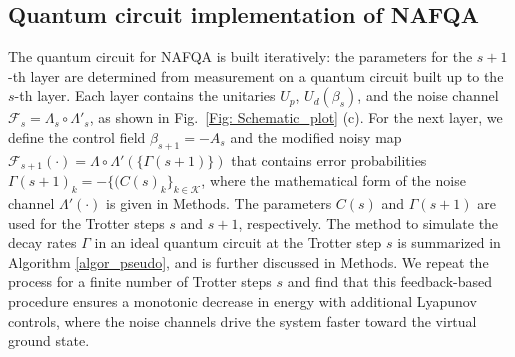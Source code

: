 \documentclass[10pt, superscriptaddress,aps,pra,twocolumn,showpacs,nofootinbib, longbibliography, notitlepage,floatfix]{revtex4-2}
\begin{document}
\subsection*{Quantum circuit implementation of NAFQA}
The quantum circuit for NAFQA is built iteratively: the parameters for the $s+1$-th layer are determined from measurement on a quantum circuit built up to the $s$-th layer. Each layer contains the unitaries $U_p$, $U_d(\beta_s)$, and the noise channel $\mathcal{F}_s = \Lambda_s \circ \Lambda'_s$, as shown in Fig.~\ref{Fig: Schematic_plot} (c). For the next layer, we define the control field $\beta_{s+1} = - A_{s}$ and the modified noisy map $\mathcal{F}_{s+1} (\cdot) = \Lambda \circ \Lambda' (\{\Gamma(s+1)\})$ that contains error probabilities $\Gamma(s+1)_k = - \{(C(s)_k\}_{k\in \mathcal{K}}$, where the mathematical form of the noise channel $\Lambda'(\cdot)$ is given in Methods. The parameters $C(s)$ and $\Gamma(s+1)$ are used for the Trotter steps $s$ and $s+1$, respectively. The method to simulate the decay rates $\Gamma$ in an ideal quantum circuit at the Trotter step $s$ is summarized in Algorithm \ref{algor_pseudo}, and is further discussed in Methods. We repeat the process for a finite number of Trotter steps $s$ and find that this feedback-based procedure ensures a monotonic decrease in energy with additional Lyapunov controls, where the noise channels drive the system faster toward the virtual ground state.


\end{document}
